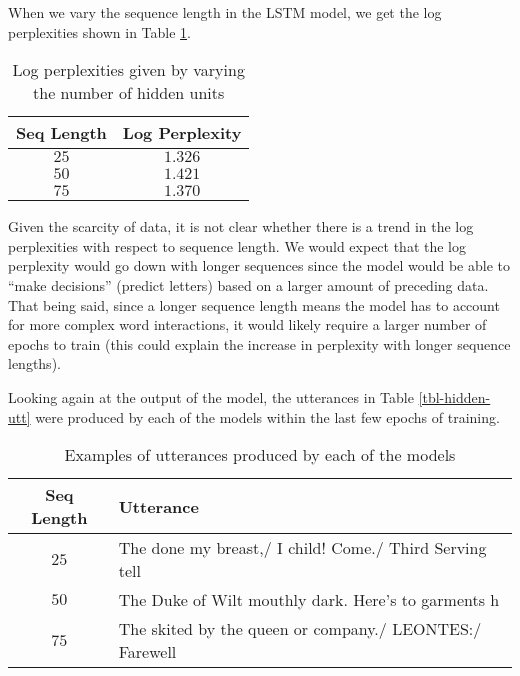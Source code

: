 \documentclass[a4paper]{article}
\begin{document}
When we vary the sequence length in the LSTM model,
we get the log perplexities shown in Table \ref{tbl-seq-perp}.

\begin{table}[h]
 \caption{Log perplexities given by varying the number of hidden units}
 \label{tbl-seq-perp}
 \begin{center}
  \begin{tabular}{cc}
    \hline \hline
    Seq Length & Log Perplexity \\
    \hline
    $25$ & $1.326$ \\
    $50$ & $1.421$ \\
    $75$ & $1.370$ \\
    \hline \hline
  \end{tabular}
 \end{center}
\end{table}

Given the scarcity of data, it is not clear whether there is a trend in the
log perplexities with respect to sequence length. We would expect that
the log perplexity would go down with longer sequences since the model
would be able to ``make decisions'' (predict letters) based on a larger
amount of preceding data. That being said, since a longer sequence length
means the model has to account for more complex word interactions, it
would likely require a larger number of epochs to train (this could
explain the increase in perplexity with longer sequence lengths).

Looking again at the output of the model, the utterances in Table
\ref{tbl-hidden-utt} were produced by each of the models within the last
few epochs of training.

\begin{table}[h]
 \caption{Examples of utterances produced by each of the models}
 \label{tbl-seq-utt}
 \begin{center}
  \begin{tabular}{cl}
    \hline \hline
    Seq Length & Utterance \\
    \hline
    $25$ & The done my breast,/ I child! Come./ Third Serving tell \\
    $50$ & The Duke of Wilt mouthly dark. Here's to garments h \\
    $75$ & The skited by the queen or company./ LEONTES:/ Farewell \\
    \hline \hline
  \end{tabular}
 \end{center}
\end{table}
\end{document}
